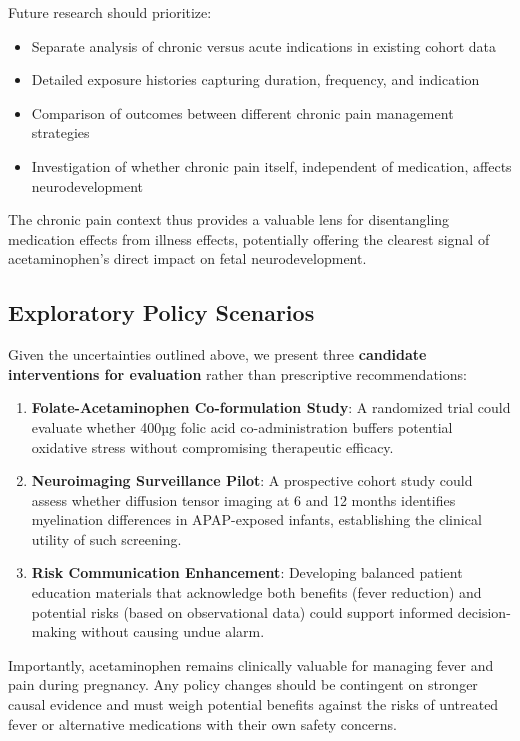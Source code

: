 \documentclass[11pt]{article}
\let\oldsubsection\subsection
\renewcommand{\subsection}[1]{\oldsubsection{#1}\setlength{\leftskip}{0.75em}}
\begin{document}
Future research should prioritize:
\begin{itemize}
\item Separate analysis of chronic versus acute indications in existing cohort data
\item Detailed exposure histories capturing duration, frequency, and indication
\item Comparison of outcomes between different chronic pain management strategies
\item Investigation of whether chronic pain itself, independent of medication, affects neurodevelopment
\end{itemize}

The chronic pain context thus provides a valuable lens for disentangling medication effects from illness effects, potentially offering the clearest signal of acetaminophen's direct impact on fetal neurodevelopment.

\subsection{Exploratory Policy Scenarios}

Given the uncertainties outlined above, we present three \textbf{candidate interventions for evaluation} rather than prescriptive recommendations:

\begin{enumerate}
\item \textbf{Folate-Acetaminophen Co-formulation Study}: A randomized trial could evaluate whether 400µg folic acid co-administration buffers potential oxidative stress without compromising therapeutic efficacy.

\item \textbf{Neuroimaging Surveillance Pilot}: A prospective cohort study could assess whether diffusion tensor imaging at 6 and 12 months identifies myelination differences in APAP-exposed infants, establishing the clinical utility of such screening.

\item \textbf{Risk Communication Enhancement}: Developing balanced patient education materials that acknowledge both benefits (fever reduction) and potential risks (based on observational data) could support informed decision-making without causing undue alarm.
\end{enumerate}

Importantly, acetaminophen remains clinically valuable for managing fever and pain during pregnancy. Any policy changes should be contingent on stronger causal evidence and must weigh potential benefits against the risks of untreated fever or alternative medications with their own safety concerns.
\end{document}
